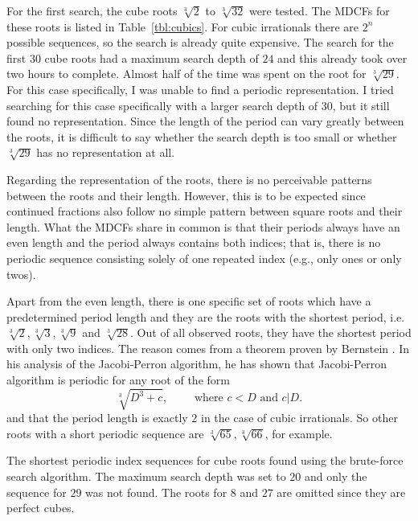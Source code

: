 For the first search, the cube roots $\sqrt[3]{2}$ to $\sqrt[3]{32}$ were tested.
The MDCFs for these roots is listed in Table~\ref{tbl:cubics}.
For cubic irrationals there are $2^n$ possible sequences,
so the search is already quite expensive.
The search for the first 30 cube roots had a maximum search depth of $24$ and
this already took over two hours to complete.
Almost half of the time was spent on the root for $\sqrt[3]{29}$.
For this case specifically, I was unable to find a periodic representation.
I tried searching for this case specifically with a larger search depth of $30$,
but it still found no representation.
Since the length of the period can vary greatly between the roots, it is
difficult to say whether the search depth is too small or whether
$\sqrt[3]{29}$ has no representation at all.

Regarding the representation of the roots,
there is no perceivable patterns between the roots and their length.
However, this is to be expected since continued fractions also follow no simple
pattern between square roots and their length.
What the MDCFs share in common is that their periods always have an even length
and the period always contains both indices;
that is, there is no periodic sequence consisting solely of one repeated index
(e.g., only ones or only twos).

Apart from the even length, there is one specific set of roots which have a
predetermined period length
and they are the roots with the shortest period, i.e. $\sqrt[3]{2},
\sqrt[3]{3}, \sqrt[3]{9}$ and $\sqrt[3]{28}$.
Out of all observed roots, they have the shortest period with only two indices.
The reason comes from a theorem proven by Bernstein \cite{Bernstein71}.
In his analysis of the Jacobi-Perron algorithm,
he has shown that Jacobi-Perron algorithm is periodic for any root of the form
\[
  \sqrt[3]{D^3 + c}, \qquad \text{ where } c < D \text{ and } c|D.
\]
and that the period length is exactly $2$ in the case of cubic irrationals.
So other roots with a short periodic sequence are $\sqrt[3]{65}, \sqrt[3]{66}$,
for example.

\begin{table}[t]
  \caption{
    The shortest periodic index sequences for cube roots found using the
    brute-force search algorithm. The maximum search depth was set to $20$ and
    only the sequence for $29$ was not found. The roots for $8$ and $27$ are
    omitted since they are perfect cubes.}
  \label{tbl:cubics}
  \centering
  
\end{table}

